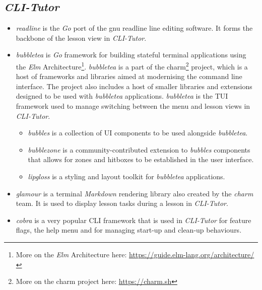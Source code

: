 \subsection{\textit{CLI-Tutor}}
\begin{itemize}
    \item \textit{readline} is the \textit{Go} port of the gnu readline
        \cite{ramey_fox_readline} line editing software. It forms the backbone
        of the lesson view in \textit{CLI-Tutor}.

    \item \textit{bubbletea} is \textit{Go} framework for building stateful terminal
        applications using the \textit{Elm} Architecture\footnote{More on the \textit{Elm}
        Architecture here: \url{https://guide.elm-lang.org/architecture/}}.
        \textit{bubbletea} is a part of the charm\footnote{More on the charm
        project here: \url{https://charm.sh}} project, which is a host of
        frameworks and libraries aimed at modernising the command line
        interface. The project also includes a host of smaller libraries and
        extensions designed to be used with \textit{bubbletea}
        applications. \textit{bubbletea} is the TUI framework used to manage
        switching between the menu and lesson views in \textit{CLI-Tutor}.

        \begin{itemize}
            \item \textit{bubbles} is a collection of UI components to be used alongside \textit{bubbletea}.
            \item \textit{bubblezone} is a community-contributed extension to
                \textit{bubbles} components that allows for zones and hitboxes
                to be established in the user interface.
            \item \textit{lipgloss} is a styling and layout toolkit for \textit{bubbletea} applications.
        \end{itemize}

    \item \textit{glamour} is a terminal \textit{Markdown} rendering library also 
        created by the \textit{charm} team. It is used to display lesson tasks
        during a lesson in \textit{CLI-Tutor}.

    \item \textit{cobra} is a very popular CLI framework that is used in
        \textit{CLI-Tutor} for feature flags, the help menu and for managing
        start-up and clean-up behaviours.
        

\end{itemize}
